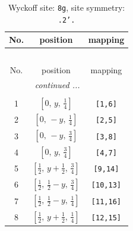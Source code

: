 \documentclass[fleqn,8pt]{jsarticle}
\begin{document}
\begin{longtable}{ccc}
\caption{Wyckoff site: {\tt 8g}, site symmetry: {\tt .2'.}}
 \\
 \hline \hline
No. & position & mapping \\ \hline \endfirsthead

\multicolumn{2}{l}{\tablename\ \thetable{}} \\
 \hline \hline
No. & position & mapping \\ \hline \endhead

 \hline \hline
\multicolumn{2}{r}{\footnotesize\it continued ...} \\ \endfoot

 \hline \hline
\multicolumn{2}{r}{} \\ \endlastfoot

1 & $\left[ 0,\, y,\, \frac{1}{4} \right]$ & {\tt [1,6]} \\ \hline
2 & $\left[ 0,\, - y,\, \frac{1}{4} \right]$ & {\tt [2,5]} \\ \hline
3 & $\left[ 0,\, - y,\, \frac{3}{4} \right]$ & {\tt [3,8]} \\ \hline
4 & $\left[ 0,\, y,\, \frac{3}{4} \right]$ & {\tt [4,7]} \\ \hline
5 & $\left[ \frac{1}{2},\, y + \frac{1}{2},\, \frac{3}{4} \right]$ & {\tt [9,14]} \\ \hline
6 & $\left[ \frac{1}{2},\, \frac{1}{2} - y,\, \frac{3}{4} \right]$ & {\tt [10,13]} \\ \hline
7 & $\left[ \frac{1}{2},\, \frac{1}{2} - y,\, \frac{1}{4} \right]$ & {\tt [11,16]} \\ \hline
8 & $\left[ \frac{1}{2},\, y + \frac{1}{2},\, \frac{1}{4} \right]$ & {\tt [12,15]} \\
\end{longtable}
\renewcommand{\arraystretch}{1.2}
\end{document}
